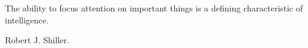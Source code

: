 %

\epigraph{The ability to focus attention on important things is a defining characteristic of 
intelligence.}{Robert J. Shiller.}
